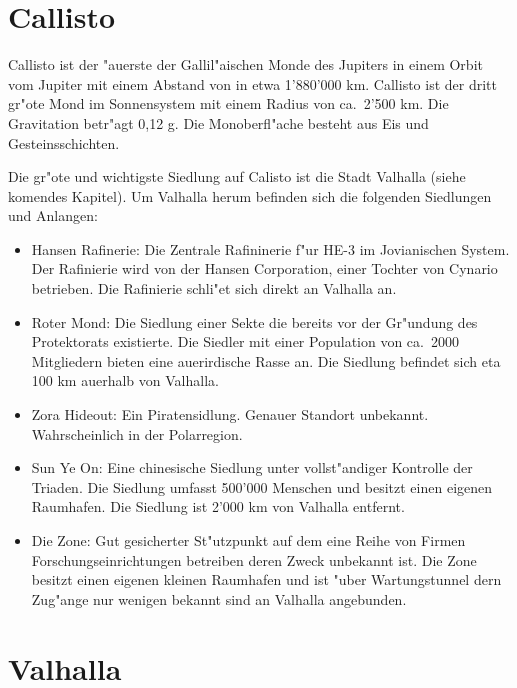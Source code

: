 \section{Callisto}

Callisto ist der "au\3erste der Gallil"aischen Monde des Jupiters in einem Orbit vom Jupiter mit einem Abstand von in
etwa 1'880'000 km. Callisto ist der dritt gr"o\3te Mond im Sonnensystem mit einem Radius von ca.~2'500 km. Die
Gravitation betr"agt 0,12 g. Die Monoberfl"ache besteht aus Eis und Gesteinsschichten.

Die gr"o\3te und wichtigste Siedlung auf Calisto ist die Stadt Valhalla (siehe komendes Kapitel). Um Valhalla herum befinden
sich die folgenden Siedlungen und Anlangen:

\begin{itemize}
    \item Hansen Rafinerie: Die Zentrale Rafininerie f"ur HE-3 im Jovianischen System. Der Rafinierie wird von der Hansen 
    Corporation, einer Tochter von Cynario betrieben. Die Rafinierie schli"e\3t sich direkt an Valhalla an.
    \item Roter Mond: Die Siedlung einer Sekte die bereits vor der Gr"undung des Protektorats existierte. Die Siedler mit einer Population von ca.~2000 Mitgliedern bieten eine au\3erirdische Rasse an. Die Siedlung befindet sich eta 100 km au\3erhalb von Valhalla.
    \item Zora Hideout: Ein Piratensidlung. Genauer Standort unbekannt. Wahrscheinlich in der Polarregion.
    \item Sun Ye On: Eine chinesische Siedlung unter vollst"andiger Kontrolle der Triaden. Die Siedlung umfasst 500'000 Menschen und besitzt einen eigenen Raumhafen. Die Siedlung ist 2'000 km von Valhalla entfernt.
    \item Die Zone: Gut gesicherter St"utzpunkt auf dem eine Reihe von Firmen Forschungseinrichtungen betreiben deren Zweck unbekannt ist. Die Zone besitzt einen eigenen kleinen Raumhafen und ist "uber Wartungstunnel dern Zug"ange nur wenigen bekannt sind an Valhalla angebunden.
\end{itemize}

\section{Valhalla}


